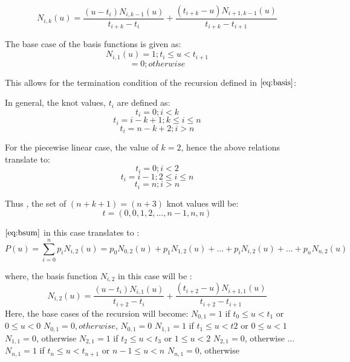 \documentclass{article}
\begin{document}
\begin{equation}
   N_{i,k}(u) = \dfrac{(u - t_i) N_{i,k-1}(u)}{t_{i+k} - t_i} + \dfrac{(t_{i+k} - u)N_{i+1,k-1}(u)}{t_{i+k} - t_{i+1}}
  \label{eq:basis}
\end{equation}

The base case of the basis functions is given as:
\[ N_{i,1}(u) = 1; t_i \leq u < t_{i+1}\]
\[ = 0 ; otherwise\]

This allows for the termination condition of the recursion defined in $\eqref{eq:basis}$: \newline

In general, the knot values, $t_i$ are defined as: \newline
\[ t_i = 0; i < k\]
\[ t_i = i-k+1; k \leq i \leq n\]
\[ t_i = n-k+2; i > n\]

For the piecewise linear case, the value of $k=2$, hence the above relations translate to: 
\[ t_i = 0; i < 2\]
\[ t_i = i-1; 2 \leq i \leq n\]
\[ t_i = n; i > n\]

Thus , the set of $(n+k+1) = (n+3)$ knot values will be: \newline
\[ t = (0,0,1,2, \dots, n-1, n,n)\]

$\eqref{eq:bsum}$ in this case translates to : \newline
\[ P(u) = \sum_{i=0}^n p_i N_{i,2}(u) = p_0 N_{0,2}(u) + p_1 N_{1,2}(u) + \dots + p_i N_{i,2}(u) + \dots + p_n N_{n,2}(u) \]

where, the basis function $N_{i,2}$ in this case will be : \newline
\begin{equation}
   N_{i,2}(u) = \dfrac{(u - t_i) N_{i,1}(u)}{t_{i+2} - t_i} + \dfrac{(t_{i+2} - u)N_{i+1,1}(u)}{t_{i+2} - t_{i+1}}
   \label{eq:linbasis}
\end{equation}
Here, the base cases of the recursion will become: \newline
$N_{0,1} = 1 $ if $t_0 \leq u < t_1 $ or $0 \leq u < 0$ \newline
$N_{0,1} = 0, otherwise$, \newline
$N_{0,1} = 0$ \newline \newline
$N_{1,1} = 1$ if $t_1 \leq u < t2$ or $0 \leq u < 1$ \newline
$N_{1,1} = 0$, otherwise \newline \newline
$N_{2,1} = 1$ if $t_2 \leq u < t_3$ or $1 \leq u < 2$ \newline
$N_{2,1} = 0$, otherwise \newline \newline
$\dots$ \newline
$N_{n,1} = 1$ if $t_n \leq u < t_{n+1}$ or $n-1 \leq u < n$  \newline
$N_{n,1} = 0$, otherwise \newline \newline
\end{document}
